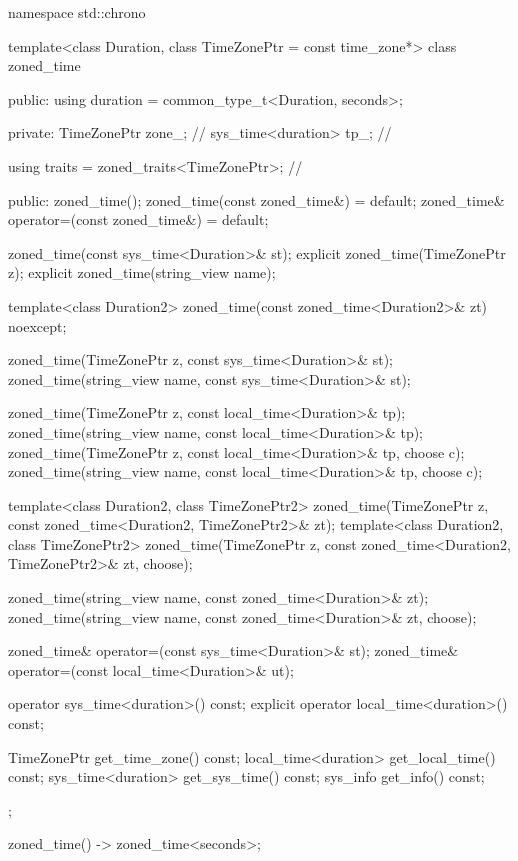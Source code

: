\begin{codeblock}
namespace std::chrono {
  template<class Duration, class TimeZonePtr = const time_zone*>
  class zoned_time {
  public:
    using duration = common_type_t<Duration, seconds>;

  private:
    TimeZonePtr        zone_;                   // \expos
    sys_time<duration> tp_;                     // \expos

    using traits = zoned_traits<TimeZonePtr>;   // \expos

  public:
    zoned_time();
    zoned_time(const zoned_time&) = default;
    zoned_time& operator=(const zoned_time&) = default;

    zoned_time(const sys_time<Duration>& st);
    explicit zoned_time(TimeZonePtr z);
    explicit zoned_time(string_view name);

    template<class Duration2>
      zoned_time(const zoned_time<Duration2>& zt) noexcept;

    zoned_time(TimeZonePtr z,    const sys_time<Duration>& st);
    zoned_time(string_view name, const sys_time<Duration>& st);

    zoned_time(TimeZonePtr z,    const local_time<Duration>& tp);
    zoned_time(string_view name, const local_time<Duration>& tp);
    zoned_time(TimeZonePtr z,    const local_time<Duration>& tp, choose c);
    zoned_time(string_view name, const local_time<Duration>& tp, choose c);

    template<class Duration2, class TimeZonePtr2>
      zoned_time(TimeZonePtr z, const zoned_time<Duration2, TimeZonePtr2>& zt);
    template<class Duration2, class TimeZonePtr2>
      zoned_time(TimeZonePtr z, const zoned_time<Duration2, TimeZonePtr2>& zt, choose);

    zoned_time(string_view name, const zoned_time<Duration>& zt);
    zoned_time(string_view name, const zoned_time<Duration>& zt, choose);

    zoned_time& operator=(const sys_time<Duration>& st);
    zoned_time& operator=(const local_time<Duration>& ut);

    operator sys_time<duration>() const;
    explicit operator local_time<duration>() const;

    TimeZonePtr          get_time_zone()  const;
    local_time<duration> get_local_time() const;
    sys_time<duration>   get_sys_time()   const;
    sys_info             get_info()       const;
  };

  zoned_time() -> zoned_time<seconds>;

}
\end{codeblock}
